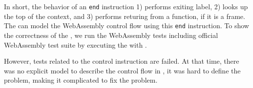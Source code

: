In short, the behavior of an \texttt{end} instruction 1) performs exiting
label, 2) looks up the top of the context, and 3) performs returing from a
function, if it is a frame.
The \spectecp{} can model the WebAssembly control flow using this \texttt{end}
instruction.
To show the correctness of the \spectecp{}, we run the WebAssembly tests
including official WebAssembly test suite by executing the \spectecp{} with
.


However, tests related to the control instruction are failed.
At that time, there was no explicit model to describe the control flow in
\spectecp{}, it was hard to define the problem, making it complicated to fix
the problem.






